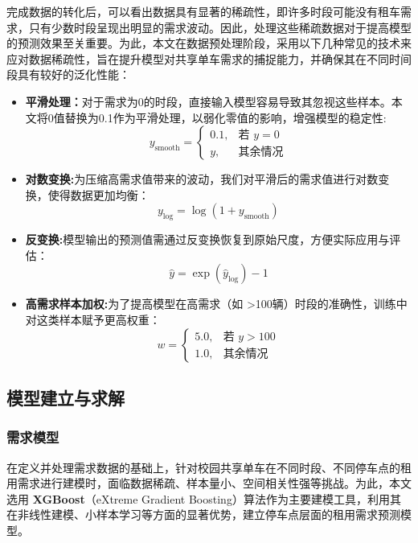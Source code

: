 \documentclass[withoutpreface,bwprint]{cumcmthesis}
\begin{document}
 完成数据的转化后，可以看出数据具有显著的稀疏性，即许多时段可能没有租车需求，只有少数时段呈现出明显的需求波动。因此，处理这些稀疏数据对于提高模型的预测效果至关重要。为此，本文在数据预处理阶段，采用以下几种常见的技术来应对数据稀疏性，旨在提升模型对共享单车需求的捕捉能力，并确保其在不同时间段具有较好的泛化性能：
 \begin{itemize}
     \item \textbf{平滑处理：}对于需求为0的时段，直接输入模型容易导致其忽视这些样本。本文将0值替换为0.1作为平滑处理，以弱化零值的影响，增强模型的稳定性:
     \begin{equation}
         y_{\text{smooth}} =
        \begin{cases}
        0.1, & \text{若 } y = 0 \\
        y, & \text{其余情况}
        \end{cases}
     \end{equation}
    
     \item \textbf{对数变换:}为压缩高需求值带来的波动，我们对平滑后的需求值进行对数变换，使得数据更加均衡：
     \begin{equation}       
        y_{\text{log}} = \log(1 + y_{\text{smooth}})
     \end{equation}

     \item \textbf{反变换:}模型输出的预测值需通过反变换恢复到原始尺度，方便实际应用与评估：
     \begin{equation}               
        \hat{y} = \exp(\hat{y}_{\text{log}}) - 1
     \end{equation}

     \item \textbf{高需求样本加权:}为了提高模型在高需求（如 >100辆）时段的准确性，训练中对这类样本赋予更高权重：
     \begin{equation}                  
        w =
        \begin{cases}
        5.0, & \text{若 } y > 100 \\
        1.0, & \text{其余情况}
        \end{cases}
     \end{equation}
 \end{itemize}
 
\subsection{模型建立与求解}
\subsubsection{需求模型}
在定义并处理需求数据的基础上，针对校园共享单车在不同时段、不同停车点的租用需求进行建模时，面临数据稀疏、样本量小、空间相关性强等挑战。为此，本文选用 \textbf{XGBoost}（eXtreme Gradient Boosting）算法作为主要建模工具，利用其在非线性建模、小样本学习等方面的显著优势，建立停车点层面的租用需求预测模型。
\end{document}
